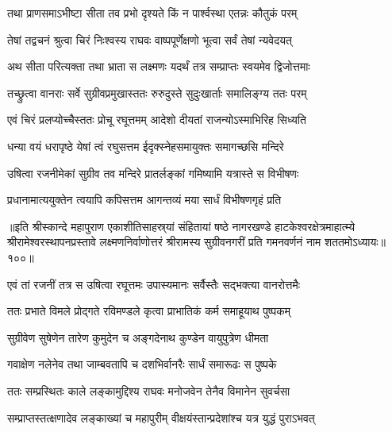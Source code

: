 \twolineshloka
{तथा प्राणसमाऽभीष्टा सीता तव प्रभो}
{दृश्यते किं न पार्श्वस्था एतन्नः कौतुकं परम्}%


\twolineshloka
{तेषां तद्वचनं श्रुत्वा चिरं निःश्वस्य राघवः}
{वाष्पपूर्णेक्षणो भूत्वा सर्वं तेषां न्यवेदयत्}%

\twolineshloka
{अथ सीता परित्यक्ता तथा भ्राता स लक्ष्मणः}
{यदर्थं तत्र सम्प्राप्तः स्वयमेव द्विजोत्तमाः}%

\twolineshloka
{तच्छ्रुत्वा वानराः सर्वे सुग्रीवप्रमुखास्ततः}
{रुरुदुस्ते सुदुःखार्ताः समालिङ्ग्य ततः परम्}%

\twolineshloka
{एवं चिरं प्रलप्योच्चैस्ततः प्रोचू रघूत्तमम्}
{आदेशो दीयतां राजन्योऽस्माभिरिह सिध्यति}%

\twolineshloka
{धन्या वयं धरापृष्ठे येषां त्वं रघुसत्तम}
{ईदृक्स्नेहसमायुक्तः समागच्छसि मन्दिरे}%


\twolineshloka
{उषित्वा रजनीमेकां सुग्रीव तव मन्दिरे} 
{प्रातर्लङ्कां गमिष्यामि यत्रास्ते स विभीषणः}%

\twolineshloka
{प्रधानामात्ययुक्तेन त्वयापि कपिसत्तम}
{आगन्तव्यं मया सार्धं विभीषणगृहं प्रति}%

॥इति श्रीस्कान्दे महापुराण एकाशीतिसाहस्र्यां संहितायां षष्ठे नागरखण्डे हाटकेश्वरक्षेत्रमाहात्म्ये श्रीरामेश्वरस्थापनप्रस्तावे लक्ष्मणनिर्वाणोत्तरं श्रीरामस्य सुग्रीवनगरीं प्रति गमनवर्णनं नाम शततमोऽध्यायः॥१००॥

\resetShloka


\twolineshloka
{एवं तां रजनीं तत्र स उषित्वा रघूत्तमः}
{उपास्यमानः सर्वैस्तैः सद्भक्त्या वानरोत्तमैः}%

\twolineshloka
{ततः प्रभाते विमले प्रोद्गते रविमण्डले}
{कृत्वा प्राभातिकं कर्म समाहूयाथ पुष्पकम्}%

\twolineshloka
{सुग्रीवेण सुषेणेन तारेण कुमुदेन च}
{अङ्गदेनाथ कुण्डेन वायुपुत्रेण धीमता}%

\twolineshloka
{गवाक्षेण नलेनेव तथा जाम्बवतापि च}
{दशभिर्वानरैः सार्धं समारूढः स पुष्पके}%

\twolineshloka
{ततः सम्प्रस्थितः काले लङ्कामुद्दिश्य राघवः}
{मनोजवेन तेनैव विमानेन सुवर्चसा}%

\twolineshloka
{सम्प्राप्तस्तत्क्षणादेव लङ्काख्यां च महापुरीम्}
{वीक्षयंस्तान्प्रदेशांश्च यत्र युद्धं पुराऽभवत्}%

